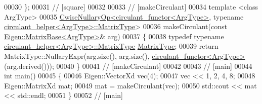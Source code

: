 \begin{DoxyCode}
00030 \};
00031 \textcolor{comment}{// [square]}
00032 
00033 \textcolor{comment}{// [makeCirculant]}
00034 \textcolor{keyword}{template} <\textcolor{keyword}{class} ArgType>
00035 \hyperlink{group___core___module_class_eigen_1_1_cwise_nullary_op}{CwiseNullaryOp<circulant\_functor<ArgType>}, \textcolor{keyword}{typename} 
      \hyperlink{group___core___module_class_eigen_1_1_matrix}{circulant\_helper<ArgType>::MatrixType}>
00036 makeCirculant(\textcolor{keyword}{const} \hyperlink{group___core___module_class_eigen_1_1_matrix_base}{Eigen::MatrixBase<ArgType>}& arg)
00037 \{
00038   \textcolor{keyword}{typedef} \textcolor{keyword}{typename} \hyperlink{group___core___module_class_eigen_1_1_matrix}{circulant\_helper<ArgType>::MatrixType} 
      \hyperlink{group___core___module_class_eigen_1_1_matrix}{MatrixType};
00039   \textcolor{keywordflow}{return} MatrixType::NullaryExpr(arg.size(), arg.size(), 
      \hyperlink{classcirculant__functor}{circulant\_functor<ArgType>}(arg.derived()));
00040 \}
00041 \textcolor{comment}{// [makeCirculant]}
00042 
00043 \textcolor{comment}{// [main]}
00044 \textcolor{keywordtype}{int} main()
00045 \{
00046   Eigen::VectorXd vec(4);
00047   vec << 1, 2, 4, 8;
00048   Eigen::MatrixXd mat;
00049   mat = makeCirculant(vec);
00050   std::cout << mat << std::endl;
00051 \}
00052 \textcolor{comment}{// [main]}
\end{DoxyCode}
